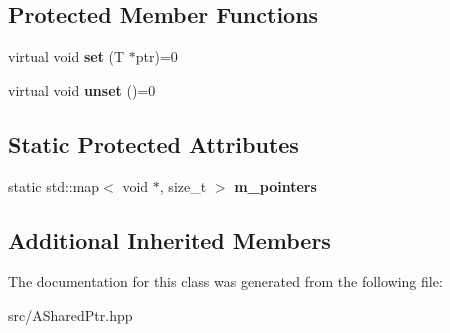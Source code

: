 \subsection*{Protected Member Functions}
\begin{DoxyCompactItemize}
\item 
\mbox{\label{classathome_1_1utility_1_1memory_1_1_a_shared_ptr_ac6160504a62b5ace954ad000545b4fa5}} 
virtual void {\bfseries set} (T $\ast$ptr)=0
\item 
\mbox{\label{classathome_1_1utility_1_1memory_1_1_a_shared_ptr_ab9b21fad911c36a7410448c0bbb73681}} 
virtual void {\bfseries unset} ()=0
\end{DoxyCompactItemize}
\subsection*{Static Protected Attributes}
\begin{DoxyCompactItemize}
\item 
\mbox{\label{classathome_1_1utility_1_1memory_1_1_a_shared_ptr_aeb75c2e0eaa15bea977c566b86354af1}} 
static std\+::map$<$ void $\ast$, size\+\_\+t $>$ {\bfseries m\+\_\+pointers}
\end{DoxyCompactItemize}
\subsection*{Additional Inherited Members}


The documentation for this class was generated from the following file\+:\begin{DoxyCompactItemize}
\item 
src/A\+Shared\+Ptr.\+hpp\end{DoxyCompactItemize}
